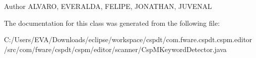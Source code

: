 \begin{DoxyAuthor}{Author}
A\+L\+V\+A\+RO, E\+V\+E\+R\+A\+L\+DA, F\+E\+L\+I\+PE, J\+O\+N\+A\+T\+H\+AN, J\+U\+V\+E\+N\+AL 
\end{DoxyAuthor}


The documentation for this class was generated from the following file\+:\begin{DoxyCompactItemize}
\item 
C\+:/\+Users/\+E\+V\+A/\+Downloads/eclipse/workspace/cspdt/com.\+fware.\+cspdt.\+cspm.\+editor/src/com/fware/cspdt/cspm/editor/scanner/Csp\+M\+Keyword\+Detector.\+java\end{DoxyCompactItemize}
